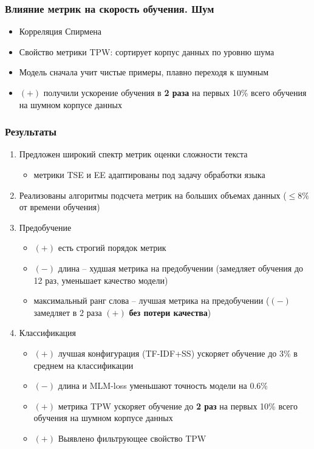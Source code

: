 \documentclass{beamer}
\begin{document}
\begin{frame}
	\frametitle{Влияние метрик на скорость обучения. Шум}
	\begin{itemize}
		\item Корреляция Спирмена
			
		\item Свойство метрики TPW: сортирует корпус данных по уровню шума
		\item Модель сначала учит чистые примеры, плавно переходя к шумным
		\item {\bf\color{green}$(+)$} получили ускорение обучения в {\bf 2 раза} на первых 10\% всего обучения на шумном корпусе данных
	\end{itemize}
\end{frame}

\begin{frame}
	\frametitle{Результаты}
	\begin{enumerate}
		\item Предложен широкий спектр метрик оценки сложности текста
		\begin{itemize}
			\item метрики TSE и EE адаптированы под задачу обработки языка
		\end{itemize}
		\item Реализованы алгоритмы подсчета метрик на больших объемах данных ($\le 8\%$ от времени обучения)
		\item Предобучение
			\begin{itemize}
				\item {\bf\color{green}$(+)$} есть строгий порядок метрик
				\item {\bf\color{red}$(-)$} длина -- худшая метрика на предобучении (замедляет обучения до 12 раз, уменьшает качество модели)
				\item максимальный ранг слова -- лучшая метрика на предобучении ({\bf\color{red}$(-)$}замедляет в $2$ раза {\bf\color{green}$(+)$} {\bf без потери качества})
			\end{itemize}
		\item Классификация
			\begin{itemize}
				\item {\bf\color{green}$(+)$} лучшая конфигурация (TF-IDF+SS) ускоряет обучение до 3\% в среднем на классификации
				\item {\bf\color{red}$(-)$} длина и MLM-loss уменьшают точность модели на 0.6\%
				\item 
				{\bf\color{green}$(+)$} метрика TPW ускоряет обучение до {\bf 2 раз} на первых 10\% всего обучения на шумном корпусе данных
				\item {\bf\color{green}$(+)$} Выявлено фильтрующее свойство TPW
			\end{itemize}
	\end{enumerate}
\end{frame}
\end{document}
